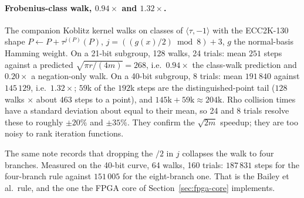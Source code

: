 \paragraph{Frobenius-class walk, $0.94\times$ and $1.32\times$.}
The companion Koblitz kernel walks on classes of $\langle\tau,-1\rangle$
with the ECC2K-130 shape $P\leftarrow P+\tau^{j(P)}(P)$, $j=((g(x)/2)
\bmod 8)+3$, $g$ the normal-basis Hamming weight. On a 21-bit
subgroup, 128 walks, 24 trials: mean $251$ steps against a predicted
$\sqrt{\pi r/(4m)}=268$, i.e.\ $0.94\times$ the class-walk prediction
and $0.20\times$ a negation-only walk. On a 40-bit subgroup, 8 trials:
mean $191\,840$ against $145\,129$, i.e.\ $1.32\times$; $59$k of the
$192$k steps are the distinguished-point tail ($128$ walks $\times$
about $463$ steps to a point), and $145\mathrm{k}+59\mathrm{k}\approx
204\mathrm{k}$. Rho collision times have a standard deviation about
equal to their mean, so 24 and 8 trials resolve these to roughly
$\pm 20\%$ and $\pm 35\%$. They confirm the $\sqrt{2m}$ speedup; they
are too noisy to rank iteration
functions.

The same note records that dropping the $/2$ in $j$ collapses the walk
to four branches. Measured on the 40-bit curve, 64 walks, 160 trials:
$187\,831$ steps for the four-branch rule against $151\,005$ for the
eight-branch one. That is the Bailey et al.\ rule, and the one the
FPGA core of Section~\ref{sec:fpga-core} implements.

